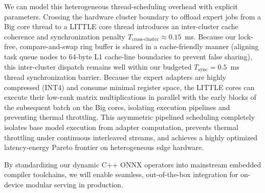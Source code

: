 \begin{enumerate}
  We can model this heterogeneous thread-scheduling overhead with explicit parameters. Crossing the hardware cluster boundary to offload expert jobs from a Big core thread to a LITTLE core thread introduces an inter-cluster cache coherence and synchronization penalty $T_{\text{cross-cluster}} \approx 0.15$~ms. Because our lock-free, compare-and-swap ring buffer is shared in a cache-friendly manner (aligning task queue nodes to 64-byte L1 cache-line boundaries to prevent false sharing), this inter-cluster dispatch remains well within our budgeted $T_{\text{sync}} = 0.5$~ms thread synchronization barrier. Because the expert adapters are highly compressed (INT4) and consume minimal register space, the LITTLE cores can execute their low-rank matrix multiplications in parallel with the early blocks of the subsequent batch on the Big cores, isolating execution pipelines and preventing thermal throttling. This asymmetric pipelined scheduling completely isolates base model execution from adapter computation, prevents thermal throttling under continuous interleaved streams, and achieves a highly optimized latency-energy Pareto frontier on heterogeneous edge hardware.
\end{enumerate}
By standardizing our dynamic C++ ONNX operators into mainstream embedded compiler toolchains, we will enable seamless, out-of-the-box integration for on-device modular serving in production.
